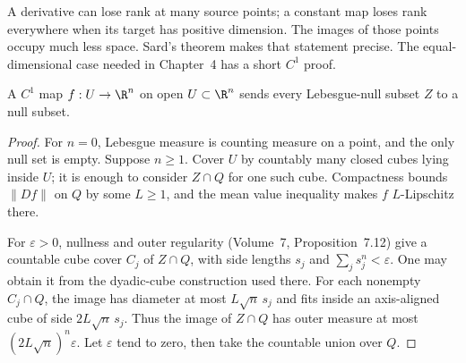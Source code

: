 A derivative can lose rank at many source points; a constant map loses rank everywhere when its target has positive dimension. The images of those points occupy much less space. Sard's theorem makes that statement precise. The equal-dimensional case needed in Chapter~4 has a short $C^1$ proof.

\begin{lemma}\label{lem:nullsets}
A $C^1$ map $f:U\to\R^n$ on open $U\subset\R^n$ sends every Lebesgue-null subset $Z$ to a null subset.
\end{lemma}
\begin{proof}
For $n=0$, Lebesgue measure is counting measure on a point, and the only null set is empty. Suppose $n\ge1$. Cover $U$ by countably many closed cubes lying inside $U$; it is enough to consider $Z\cap Q$ for one such cube. Compactness bounds $\|Df\|$ on $Q$ by some $L\ge1$, and the mean value inequality makes $f$ $L$-Lipschitz there.

For $\varepsilon>0$, nullness and outer regularity (Volume~7, Proposition~7.12) give a countable cube cover $C_j$ of $Z\cap Q$, with side lengths $s_j$ and $\sum_js_j^n<\varepsilon$. One may obtain it from the dyadic-cube construction used there. For each nonempty $C_j\cap Q$, the image has diameter at most $L\sqrt n\,s_j$ and fits inside an axis-aligned cube of side $2L\sqrt n\,s_j$. Thus the image of $Z\cap Q$ has outer measure at most $(2L\sqrt n)^n\varepsilon$. Let $\varepsilon$ tend to zero, then take the countable union over $Q$.
\end{proof}

